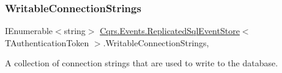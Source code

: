 \subsubsection{\texorpdfstring{Writable\+Connection\+Strings}{WritableConnectionStrings}}
{\footnotesize\ttfamily I\+Enumerable$<$string$>$ \hyperlink{classCqrs_1_1Events_1_1ReplicatedSqlEventStore}{Cqrs.\+Events.\+Replicated\+Sql\+Event\+Store}$<$ T\+Authentication\+Token $>$.Writable\+Connection\+Strings\hspace{0.3cm}{\ttfamily [get]}, {\ttfamily [protected]}}



A collection of connection strings that are used to write to the database. 

